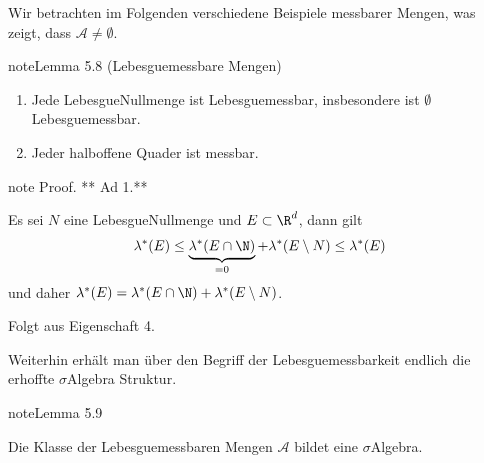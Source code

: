 \documentclass[letterpaper,10pt,english]{jupyterBook}
\begin{document}
\sphinxAtStartPar
Wir betrachten im Folgenden verschiedene Beispiele messbarer Mengen, was zeigt, dass \(\mathcal{A}\neq \emptyset\).
\label{masstheorie/masstheorie:thm:lebesguemes}
\begin{sphinxadmonition}{note}{Lemma 5.8 (Lebesgue\sphinxhyphen{}messbare Mengen)}


\begin{enumerate}
%
\item {} 
\sphinxAtStartPar
Jede Lebesgue\sphinxhyphen{}Nullmenge ist Lebesgue\sphinxhyphen{}messbar, insbesondere ist \(\emptyset\) Lebesgue\sphinxhyphen{}messbar.

\item {} 
\sphinxAtStartPar
Jeder halboffene Quader ist messbar.

\end{enumerate}
\end{sphinxadmonition}

\begin{sphinxadmonition}{note}
\sphinxAtStartPar
Proof. ** Ad 1.**

\sphinxAtStartPar
Es sei \(N\) eine Lebesgue\sphinxhyphen{}Nullmenge und \(E\subset\R^d\), dann gilt
\begin{equation*}
\begin{split}\lambda^\ast(E) \leq \underbrace{\lambda^\ast(E\cap\N)}_{=0} + \lambda^\ast(E\setminus N)\leq
 \lambda^\ast(E)\end{split}
\end{equation*}
\sphinxAtStartPar
und daher \(\lambda^\ast(E) = \lambda^\ast(E\cap\N) + \lambda^\ast(E\setminus N)\).

\sphinxAtStartPar
{}

\sphinxAtStartPar
Folgt aus {\hyperref[\detokenize{masstheorie/masstheorie:thm:outerlebesgue}]{}} Eigenschaft 4.
\end{sphinxadmonition}

\sphinxAtStartPar
Weiterhin erhält man über den Begriff der Lebesgue\sphinxhyphen{}messbarkeit endlich die erhoffte \(\sigma\)\sphinxhyphen{}Algebra Struktur.
\label{masstheorie/masstheorie:lemma-35}
\begin{sphinxadmonition}{note}{Lemma 5.9}



\sphinxAtStartPar
Die Klasse der Lebesgue\sphinxhyphen{}messbaren Mengen \(\mathcal{A}\) bildet eine \(\sigma\)\sphinxhyphen{}Algebra.
\end{sphinxadmonition}
\end{document}
